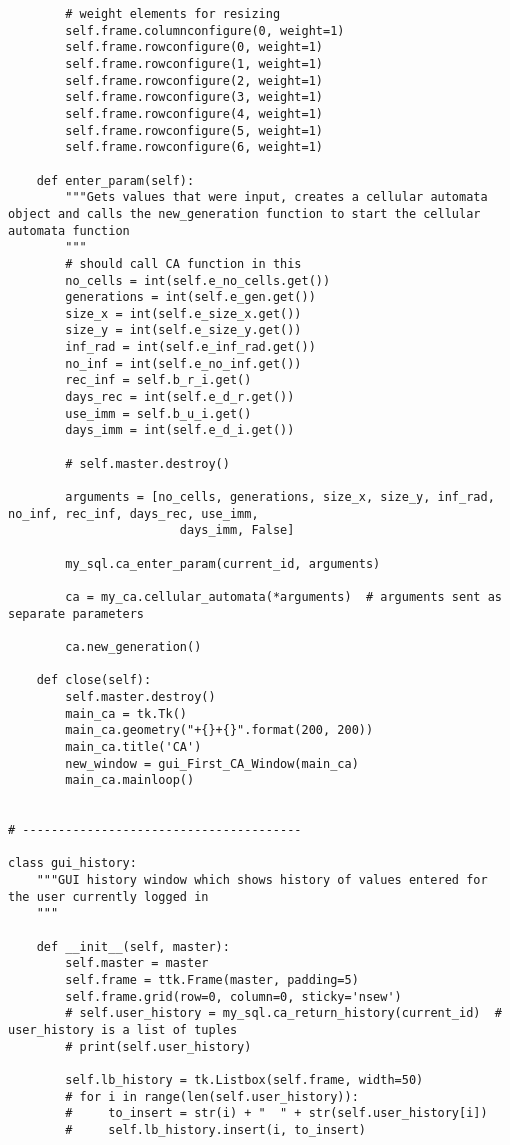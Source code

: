 \documentclass[11pt, a4paper]{article}
\begin{document}
\begin{lstlisting}
        # weight elements for resizing
        self.frame.columnconfigure(0, weight=1)
        self.frame.rowconfigure(0, weight=1)
        self.frame.rowconfigure(1, weight=1)
        self.frame.rowconfigure(2, weight=1)
        self.frame.rowconfigure(3, weight=1)
        self.frame.rowconfigure(4, weight=1)
        self.frame.rowconfigure(5, weight=1)
        self.frame.rowconfigure(6, weight=1)

    def enter_param(self):
        """Gets values that were input, creates a cellular automata object and calls the new_generation function to start the cellular automata function
        """
        # should call CA function in this
        no_cells = int(self.e_no_cells.get())
        generations = int(self.e_gen.get())
        size_x = int(self.e_size_x.get())
        size_y = int(self.e_size_y.get())
        inf_rad = int(self.e_inf_rad.get())
        no_inf = int(self.e_no_inf.get())
        rec_inf = self.b_r_i.get()
        days_rec = int(self.e_d_r.get())
        use_imm = self.b_u_i.get()
        days_imm = int(self.e_d_i.get())

        # self.master.destroy()

        arguments = [no_cells, generations, size_x, size_y, inf_rad, no_inf, rec_inf, days_rec, use_imm,
                        days_imm, False]

        my_sql.ca_enter_param(current_id, arguments)

        ca = my_ca.cellular_automata(*arguments)  # arguments sent as separate parameters

        ca.new_generation()

    def close(self):
        self.master.destroy()
        main_ca = tk.Tk()
        main_ca.geometry("+{}+{}".format(200, 200))
        main_ca.title('CA')
        new_window = gui_First_CA_Window(main_ca)
        main_ca.mainloop()


# ---------------------------------------

class gui_history:
    """GUI history window which shows history of values entered for the user currently logged in
    """

    def __init__(self, master):
        self.master = master
        self.frame = ttk.Frame(master, padding=5)
        self.frame.grid(row=0, column=0, sticky='nsew')
        # self.user_history = my_sql.ca_return_history(current_id)  # user_history is a list of tuples
        # print(self.user_history)

        self.lb_history = tk.Listbox(self.frame, width=50)
        # for i in range(len(self.user_history)):
        #     to_insert = str(i) + "  " + str(self.user_history[i])
        #     self.lb_history.insert(i, to_insert)


\end{lstlisting}
\end{document}
